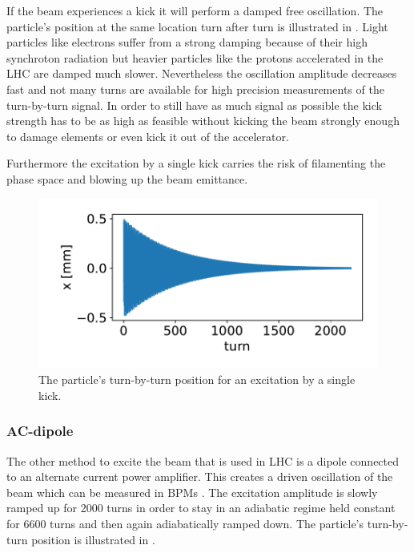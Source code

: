 If the beam experiences a kick it will perform a damped free oscillation.
The particle's position at the same location turn after turn is illustrated in .
Light particles like electrons
suffer from a strong damping because of their high synchroton radiation but heavier particles like the
protons accelerated in the LHC are damped much slower.
Nevertheless the oscillation amplitude decreases fast and not many turns are available for high
precision measurements of the turn-by-turn signal. In order to still have as much signal as possible
the kick strength has to be as high as feasible without kicking the beam strongly enough to damage elements or even kick it out of the accelerator.

Furthermore the excitation by a single kick carries the risk of filamenting the
phase space and blowing up the beam emittance.
%
\begin{figure}[h]
    \centering
    \includegraphics[width=.8\linewidth]{kick_plot.pdf}  
    \caption{The particle's turn-by-turn position for an excitation by a single kick.}
    \label{fig_kick_plot}
\end{figure}
%
\subsubsection{AC-dipole}

The other method to excite the beam that is used in LHC is a dipole connected to an alternate current
power amplifier.
This creates a driven oscillation of the beam \cite{Peggs1998} which can be measured in BPMs \cite{Miyamoto2008, Miyamoto2010}.
The excitation amplitude is slowly ramped up for 2000 turns in order to stay in an
adiabatic regime \cite{Tomas2005ac} held constant for 6600 turns and then again adiabatically ramped down.
The particle's turn-by-turn position is illustrated in .

